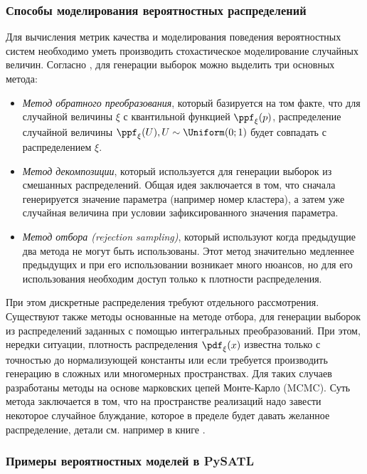 \subsubsection*{Способы моделирования вероятностных распределений} 

Для вычисления метрик качества и моделирования поведения вероятностных систем необходимо уметь производить стохастическое моделирование случайных величин. Согласно \cite{hormann2013automatic}, для генерации выборок можно выделить три основных метода:
\begin{itemize}[noitemsep, parsep=0pt, topsep=0pt]
    \item \emph{Метод обратного преобразования}, который базируется на том факте, что для случайной величины $\xi$ с квантильной функцией $\ppf_{\xi}(p)$, распределение случайной величины $\ppf_{\xi}(U), U \sim \Uniform(0;1)$ будет совпадать с распределением $\xi$. 

    \item \emph{Метод декомпозиции}, который используется для генерации выборок из смешанных распределений. Общая идея заключается в том, что сначала генерируется значение параметра (например номер кластера), а затем уже случайная величина при условии зафиксированного значения параметра. 
    
    \item \emph{Метод отбора (rejection sampling)}, который используют когда предыдущие два метода не могут быть использованы. Этот метод значительно медленнее предыдущих и при его использовании возникает много нюансов, но для его использования необходим доступ только к плотности распределения. 
\end{itemize}
При этом дискретные распределения требуют отдельного рассмотрения. Существуют также методы основанные на методе отбора, для генерации выборок из распределений заданных с помощью интегральных преобразований.  При этом, нередки ситуации, плотность распределения \(\pdf_\xi(x)\) известна только с точностью до нормализующей константы или если требуется производить генерацию в сложных или многомерных пространствах. Для таких случаев разработаны методы на основе марковских цепей Монте-Карло (MCMC). Суть метода заключается в том, что на пространстве реализаций надо завести некоторое случайное блуждание, которое в пределе будет давать желанное распределение, детали см{.} например в книге \cite{liang2011advanced}. 

\subsubsection*{Примеры вероятностных моделей в PySATL}

